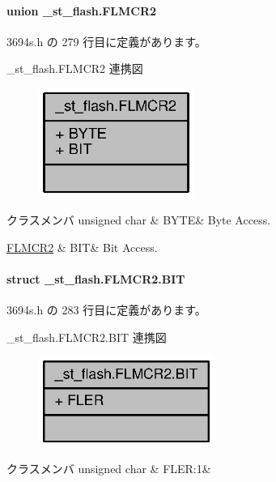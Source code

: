 \paragraph{union \+\_\+st\+\_\+flash.\+F\+L\+M\+C\+R2}


 3694s.\+h の 279 行目に定義があります。



\+\_\+st\+\_\+flash.\+F\+L\+M\+C\+R2 連携図
\nopagebreak
\begin{figure}[H]
\begin{center}
\leavevmode
\includegraphics[width=143pt]{de/dc2/union__st__flash_8FLMCR2__coll__graph}
\end{center}
\end{figure}
\begin{DoxyFields}{クラスメンバ}
unsigned char\label{3694s_8h_ae409eb2ba6eb6801f52763ae370c350e}
&
B\+Y\+T\+E&
Byte Access. \\
\hline

\hyperlink{3694s_8h_d1/d7a/struct__st__flash_8FLMCR2_8BIT}{F\+L\+M\+C\+R2}\label{3694s_8h_adb957fdc8000e1eef04a243f5199aa52}
&
B\+I\+T&
Bit Access. \\
\hline

\end{DoxyFields}
\label{struct__st__flash_8FLMCR2_8BIT}
\paragraph{struct \+\_\+st\+\_\+flash.\+F\+L\+M\+C\+R2.\+B\+I\+T}


 3694s.\+h の 283 行目に定義があります。



\+\_\+st\+\_\+flash.\+F\+L\+M\+C\+R2.\+B\+I\+T 連携図
\nopagebreak
\begin{figure}[H]
\begin{center}
\leavevmode
\includegraphics[width=162pt]{de/d02/struct__st__flash_8FLMCR2_8BIT__coll__graph}
\end{center}
\end{figure}
\begin{DoxyFields}{クラスメンバ}
unsigned char\label{3694s_8h_a0f59c0a64793dca1f2164b7bd3477df4}
&
F\+L\+E\+R\+:1&
\\
\hline

\end{DoxyFields}
\label{union__st__flash_8FLPWCR}
